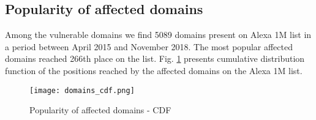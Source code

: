 \subsection{Popularity of affected domains}

Among the vulnerable domains we find 5089 domains present on Alexa 1M list in a period between April 2015 and November 2018. The most popular affected domains reached 266th place on the list. Fig. \ref{fig:domains_cdf} presents cumulative distribution function of the positions reached  by the affected domains on the Alexa 1M list. 


\begin{figure}[!hbt]
\centering
\texttt{[image: domains\_cdf.png]}
\caption{Popularity of affected domains - CDF}
\label{fig:domains_cdf}
\end{figure}
